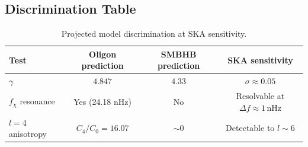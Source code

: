 \subsection{Discrimination Table}

\begin{table}[h]
\centering
\caption{Projected model discrimination at SKA sensitivity.}
\label{tab:ska_discrimination}
\begin{tabular}{lccc}
\hline
Test & Oligon prediction & SMBHB prediction & SKA sensitivity \\
\hline
$\gamma$ & $4.847$ & $4.33$ & $\sigma \approx 0.05$ \\
$f_\chi$ resonance & Yes (24.18 nHz) & No & Resolvable at $\Delta f \approx 1\,$nHz \\
$l=4$ anisotropy & $C_4/C_0 = 16.07$ & $\sim 0$ & Detectable to $l \sim 6$ \\
\hline
\end{tabular}
\end{table}
